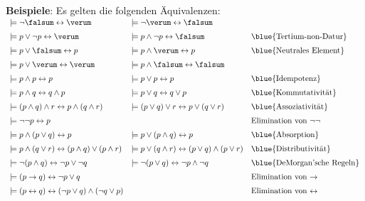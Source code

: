 \noindent
\textbf{Beispiele}:  Es gelten die folgenden Äquivalenzen: \\[0.3cm]
\hspace*{0.3cm} 
$\begin{array}{lll}
\models \neg \falsum \leftrightarrow \verum & \models \neg \verum \leftrightarrow \falsum &  \\[0.2cm]
 \models p \vee   \neg p \leftrightarrow \verum & \models p \wedge \neg p \leftrightarrow \falsum & \mbox{\blue{Tertium-non-Datur}} \\[0.2cm]
 \models p \vee   \falsum \leftrightarrow p & \models p \wedge \verum  \leftrightarrow p & \mbox{\blue{Neutrales Element}}\\[0.2cm]
 \models p \vee   \verum  \leftrightarrow \verum & \models p \wedge \falsum \leftrightarrow \falsum &  \\[0.2cm]
 \models p \wedge p \leftrightarrow p  & \models p \vee p \leftrightarrow p &  \mbox{\blue{Idempotenz}}\index{Idempotenz} \\[0.2cm]
 \models p \wedge q \leftrightarrow q \wedge p & \models p \vee   q \leftrightarrow q \vee p & \mbox{\blue{Kommutativität}}\index{Kommutativität} \\[0.2cm]
 \models (p \wedge q) \wedge r \leftrightarrow p \wedge (q \wedge r) & \models (p \vee   q) \vee r \leftrightarrow p \vee   (q \vee r)  &
 \mbox{\blue{Assoziativität}}\index{Assoziativität} \\[0.2cm]
 \models \neg \neg p \leftrightarrow p & & \mbox{Elimination von $\neg \neg$} \\[0.2cm]
 \models p \wedge (p \vee q)   \leftrightarrow p & \models p \vee   (p \wedge q) \leftrightarrow p &  \mbox{\blue{Absorption}}\index{Absorption} \\[0.2cm]
 \models p \wedge (q \vee r)   \leftrightarrow (p \wedge q) \vee   (p \wedge r) & 
 \models p \vee   (q \wedge r) \leftrightarrow (p \vee q)   \wedge (p \vee   r) & \mbox{\blue{Distributivität}}\index{Distributivität} \\[0.2cm]
 \models \neg (p \wedge q) \leftrightarrow  \neg p \vee   \neg q &  \models \neg (p \vee   q) \leftrightarrow  \neg p \wedge \neg q &
 \mbox{\blue{DeMorgan'sche Regeln}}\index{DeMorgan'sche Regeln}  \\[0.2cm]
 \models (p \rightarrow q) \leftrightarrow \neg p \vee q & &  \mbox{Elimination von $\rightarrow$} \\[0.2cm]
 \models (p \leftrightarrow q) \leftrightarrow (\neg p \vee q) \wedge (\neg q \vee p) & & \mbox{Elimination von $\leftrightarrow$}
\end{array}$ \\[0.3cm]
